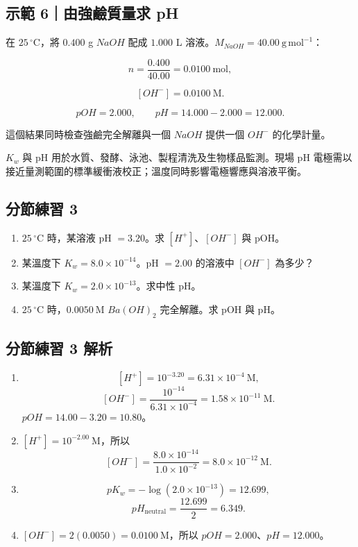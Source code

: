 \documentclass[11pt,a4paper]{article}
\providecommand{\tightlist}{%
  \setlength{\itemsep}{0pt}\setlength{\parskip}{0pt}}
\begin{document}
\begin{HandoutWorkedExample}

\subsection{示範 6｜由強鹼質量求 pH}\label{ux793aux7bc4-6ux7531ux5f37ux9e7cux8ceaux91cfux6c42-ph}

在 \(25\,^\circ\mathrm C\)，將 \(0.400\) g \(NaOH\) 配成 \(1.000\) L 溶液。\(M_{NaOH}=40.00\ \mathrm{g\,mol^{-1}}\)：

\[
n=\frac{0.400}{40.00}=0.0100\ \mathrm{mol},
\]

\[
[OH^-]=0.0100\ \mathrm M.
\]

\[
pOH=2.000,\qquad pH=14.000-2.000=12.000.
\]

這個結果同時檢查強鹼完全解離與一個 \(NaOH\) 提供一個 \(OH^-\) 的化學計量。

\end{HandoutWorkedExample}

\(K_w\) 與 pH 用於水質、發酵、泳池、製程清洗及生物樣品監測。現場 pH 電極需以接近量測範圍的標準緩衝液校正；溫度同時影響電極響應與溶液平衡。

\subsection{分節練習 3}\label{ux5206ux7bc0ux7df4ux7fd2-3}

\begin{enumerate}
\def\labelenumi{\arabic{enumi}.}
\tightlist
\item
  \(25\,^\circ\mathrm C\) 時，某溶液 pH \(=3.20\)。求 \([H^+]\)、\([OH^-]\) 與 pOH。
\item
  某溫度下 \(K_w=8.0\times10^{-14}\)。pH \(=2.00\) 的溶液中 \([OH^-]\) 為多少？
\item
  某溫度下 \(K_w=2.0\times10^{-13}\)。求中性 pH。
\item
  \(25\,^\circ\mathrm C\) 時，\(0.0050\ \mathrm M\) \(Ba(OH)_2\) 完全解離。求 pOH 與 pH。
\end{enumerate}

\subsection{分節練習 3 解析}\label{ux5206ux7bc0ux7df4ux7fd2-3-ux89e3ux6790}

\begin{enumerate}
\def\labelenumi{\arabic{enumi}.}
\tightlist
\item
  \[
   [H^+]=10^{-3.20}=6.31\times10^{-4}\ \mathrm M,
   \]
  \[
   [OH^-]=\frac{10^{-14}}{6.31\times10^{-4}}
   =1.58\times10^{-11}\ \mathrm M.
   \]
  \(pOH=14.00-3.20=10.80\)。
\item
  \([H^+]=10^{-2.00}\ \mathrm M\)，所以
  \[
   [OH^-]=\frac{8.0\times10^{-14}}{1.0\times10^{-2}}
   =8.0\times10^{-12}\ \mathrm M.
   \]
\item
  \[
   pK_w=-\log(2.0\times10^{-13})=12.699,
   \]
  \[
   pH_{\mathrm{neutral}}=\frac{12.699}{2}=6.349.
   \]
\item
  \([OH^-]=2(0.0050)=0.0100\ \mathrm M\)，所以 \(pOH=2.000\)、\(pH=12.000\)。
\end{enumerate}
\end{document}
